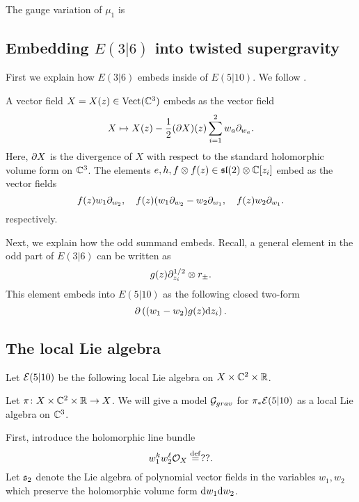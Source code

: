 \documentclass[11pt]{amsart}
\begin{document}
The gauge variation of $\mu_1$ is

\subsection{Embedding $E(3|6)$ into twisted supergravity}


\parsec[]
First we explain how $E(3|6)$ embeds inside of $E(5|10)$. 
We follow \cite{KacCheng}. 

A vector field $X = X(z) \in {\rm Vect}(\mathbb{C}^3)$ embeds as the vector field
\[
X \mapsto X(z) - \frac12 (\partial X)(z) \sum_{i=1}^2 w_a \partial_{w_a} .
\]
Here, $\partial X$ is the divergence of $X$ with respect to the standard holomorphic volume form on $\mathbb{C}^3$. 
The elements $e,h,f \otimes f(z) \in \mathfrak{sl}(2) \otimes \mathbb{C}[z_i]$ embed as the vector fields
\[
f(z) w_1 \partial_{w_2} , \quad f(z) (w_1 \partial_{w_2} - w_2 \partial_{w_1}, \quad f(z) w_2 \partial_{w_1} . 
\]
respectively. 

Next, we explain how the odd summand embeds. 
Recall, a general element in the odd part of $E(3|6)$ can be written as
\[
g(z) \partial_{z_i}^{1/2} \otimes r_\pm .
\]
This element embeds into $E(5|10)$ as the following closed two-form
\[
\partial \left((w_1-w_2) g(z) {\rm d} z_i \right) .
\]

\subsection{The local Lie algebra} 

Let $\mathcal E(5|10)$ be the following local Lie algebra on $X \times \mathbb{C}^2 \times \mathbb{R}$. 

Let $\pi \colon X \times \mathbb{C}^2 \times \mathbb R \to X$. 
We will give a model $\mathcal G_{grav}$ for $\pi_* \mathcal E(5|10)$ as a local Lie algebra on $\mathbb{C}^3$. 

First, introduce the holomorphic line bundle 
\[
w_1^k w_2^\ell \mathcal O_{X} \overset{\rm def}{=} ??  .
\]
Let $\mathfrak{s}_2$ denote the Lie algebra of polynomial vector fields in the variables $w_1,w_2$ which preserve the holomorphic volume form ${\rm d} w_1 {\rm d} w_2$. 
\end{document}
